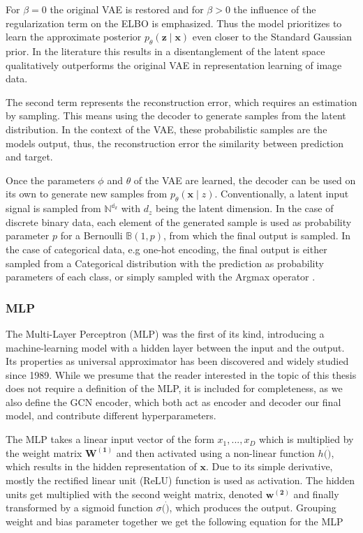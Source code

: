 For $\beta = 0$ the original VAE is restored and for $\beta>0$ the influence of the regularization term on the ELBO is emphasized. Thus the model prioritizes to learn the approximate posterior $p_{{\theta}}(\mathbf{z} \mid \mathbf{x})$ even closer to the Standard Gaussian prior. In the literature this results in a disentanglement of the latent space qualitatively outperforms the original VAE in representation learning of image data.

The second term represents the reconstruction error, which requires an estimation by sampling. This means using the decoder to generate samples from the latent distribution. In the context of the VAE, these probabilistic samples are the models output, thus, the reconstruction error the similarity between prediction and target\cite{kingma_auto-encoding_2014}.

Once the parameters $\phi$ and $\theta$ of the VAE are learned, the decoder can be used on its own to generate new samples from $p_{{\theta}}(\mathbf{x} \mid z)$. Conventionally, a latent input signal is sampled from $\mathbb{N^{d_z}}$ with $d_z$ being the latent dimension. In the case of discrete binary data, each element of the generated sample is used as probability parameter $p$ for a Bernoulli $\mathbb{B}(1,p)$, from which the final output is sampled. In the case of categorical data, e.g one-hot encoding, the final output is either sampled from a Categorical distribution with the prediction as probability parameters of each class, or simply sampled with the Argmax operator \cite{kingma_introduction_2019}. 


\subsubsection{MLP}
\label{ssec:mlp}

The Multi-Layer Perceptron (MLP) was the first of its kind, introducing a machine-learning model with a hidden layer between the input and the output. 
Its properties as universal approximator has been discovered and widely studied since 1989.
While we presume that the reader interested in the topic of this thesis does not require a definition of the MLP, it is included for completeness, as we also define the GCN encoder, which both act as encoder and decoder our final model, and contribute different hyperparameters.

The MLP takes a linear input vector of the form $x_1,...,x_D$ which is multiplied by the weight matrix $\mathbf{W^{(1)}}$ and then activated using a non-linear function $h(\dot)$, which results in the hidden representation of $\mathbf{x}$. Due to its simple derivative, mostly the rectified linear unit (ReLU) function is used as activation. The hidden units get multiplied with the second weight matrix, denoted $\mathbf{w^{(2)}}$ and finally transformed by a sigmoid function $\sigma(\dot)$, which produces the output. Grouping weight and bias parameter together we get the following equation for the MLP

